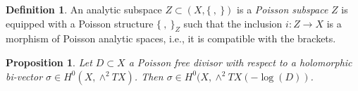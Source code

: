 \documentclass[twoside]{amsart}
\numberwithin{equation}{section}
\newtheorem{proposition}[theorem]{Proposition}
\theoremstyle{definition}
\newtheorem{definition}{Definition}[section]
\begin{document}
\begin{definition}
An analytic subspace $Z\subset (X,\{ \ , \ \})$ is a \emph{Poisson subspace} 
$Z$ is equipped with a Poisson structure $\{\ , \ \}_{Z}$
such that the inclusion $i\colon Z \to X$ is a morphism of Poisson analytic spaces, i.e., it is compatible with the brackets. 
\end{definition}




\begin{proposition}\cite[Proposition 4.4.1]{Pym3} \label{Poisson-divisor}
Let $D\subset X$ a Poisson free
divisor with respect to a holomorphic bi-vector $\sigma \in H^0(X, \wedge^2TX)$. Then $ \sigma \in H^0(X, \wedge^2TX(-\log(D))$. 
\end{proposition}





 
  
\end{document}
